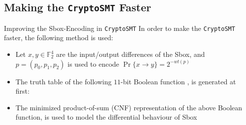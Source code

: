 \documentclass{beamer}
\begin{document}

\subsection{Making the \texttt{CryptoSMT} Faster}
\begin{frame}{Improving the Sbox-Encoding in \texttt{CryptoSMT}}
In order to make the \texttt{CryptoSMT} faster, the following method is used:
    \begin{itemize}
        \item Let $x, y\in \mathbb{F}_{2}^{4}$ are the input/output differences of the Sbox, and $p = (p_{0}, p_{1}, p_{2})$ is used to encode $\Pr\{x\to y\} = 2^{-wt(p)}$
        \item The truth table of the following $11$-bit Boolean function \cite{sun2018more}, is generated at first:
    \end{itemize}
    \begin{center}
    \end{center}
    \begin{itemize}
        \item The minimized product-of-sum (CNF) representation of the above Boolean function, is used to model the differential behaviour of Sbox
    \end{itemize}
\end{frame}
\end{document}
